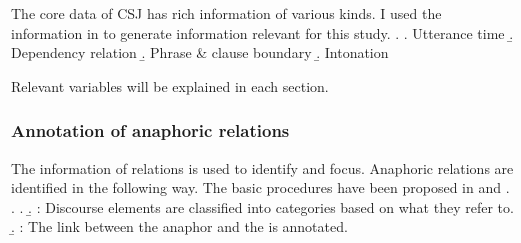 The core data of CSJ has rich information of various kinds.
I used the information in \Next to generate information relevant for this study.
%
\ex.
 \a. Utterance time
 \b. Dependency relation
 \b. Phrase \& clause boundary
 \b. Intonation

Relevant variables will be explained in each section.

\subsubsection{Annotation of anaphoric relations}\label{FW:Cor:AnaRel}

The information of  relations is used
to identify  and focus.
Anaphoric relations are identified in the following way.
The basic procedures have been proposed in  and .
\ex.\label{AnnotationProcedure} 
	\a. 
	\b. : Discourse elements are classified into categories based on what they refer to.
	\b. :
		The link between the anaphor and the  is annotated.



